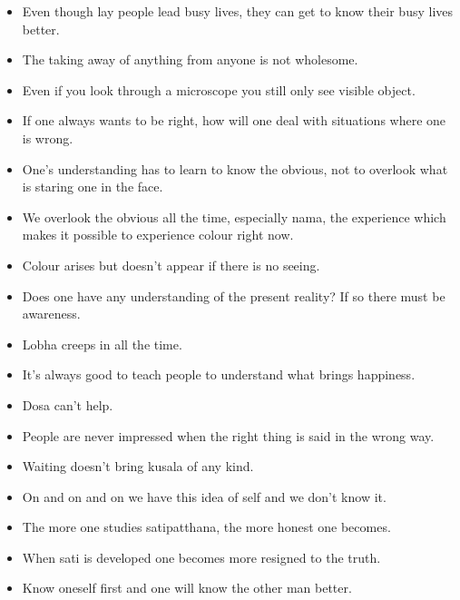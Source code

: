 \documentclass{article}
\begin{document}
\begin{itemize}
\item 
  Even though lay people lead busy lives, they can get to know their
  busy lives better.

\item 
  The taking away of anything from anyone is not wholesome.

\item 
  Even if you look through a microscope you still only see visible
  object.

\item 
  If one always wants to be right, how will one deal with situations
  where one is wrong.

\item 
  One's understanding has to learn to know the obvious, not to
  overlook what is staring one in the face.

\item 
  We overlook the obvious all the time, especially nama, the
  experience which makes it possible to experience colour right now.

\item 
  Colour arises but doesn't appear if there is no seeing.

\item 
  Does one have any understanding of the present reality? If so there
  must be awareness.

\item 
  Lobha creeps in all the time.

\item 
  It's always good to teach people to understand what brings
  happiness.

\item 
  Dosa can't help.

\item 
  People are never impressed when the right thing is said in the
  wrong way.

\item 
  Waiting doesn't bring kusala of any kind.

\item 
  On and on and on we have this idea of self and we don't know it.

\item 
  The more one studies satipatthana, the more honest one becomes.

\item 
  When sati is developed one becomes more resigned to the truth.

\item 
  Know oneself first and one will know the other man better.


\end{itemize}
\end{document}
